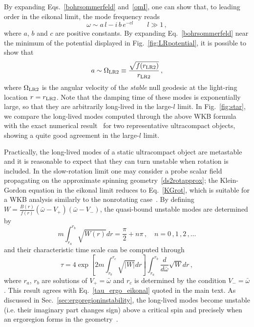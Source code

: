 \documentclass[11pt]{article}
\numberwithin{equation}{section} %
\begin{document}
%
By expanding Eqs.~\eqref{bohrsommerfeld} and~\eqref{omI}, one can show that, to leading order in the eikonal limit, the mode frequency reads
%
\begin{equation}
\omega\sim a\, l -i\, b\, e^{-c l}\qquad l\gg1\,, \label{omega}
\end{equation}
%
where $a$, $b$ and $c$ are positive constants. By expanding Eq.~\eqref{bohrsommerfeld} near the minimum of the potential displayed in Fig.~\ref{fig:LRpotential}, it is possible to show that~\cite{Cardoso:2014sna}
%
\begin{equation}
 a\sim\Omega_{\rm LR2}\equiv\frac{\sqrt{f(r_{\rm LR2})}}{r_{\rm LR2}}\,,
\end{equation}
%
where $\Omega_{\rm LR2}$ is the angular velocity of the \emph{stable} null geodesic at the light-ring location $r=r_{\rm LR2}$. Note that the damping time of these modes is exponentially large, so that they are arbitrarily long-lived in the large-$l$ limit. In Fig.~\ref{fig:star}, we compare the long-lived modes computed through the above WKB formula with the exact numerical result~\cite{Cardoso:2014sna} for two representative ultracompact objects, showing a quite good agreement in the large-$l$ limit.

Practically, the long-lived modes of a static ultracompact object are metastable and it is reasonable to expect that they can turn unstable when rotation is included. In the slow-rotation limit one may consider a probe scalar field propagating on the approximate spinning geometry~\eqref{ds2rotapprox}; the Klein-Gordon equation in the eikonal limit reduces to Eq.~\eqref{KGrot}, which is suitable for a WKB analysis similarly to the nonrotating case~\cite{CominsSchutz,Cardoso:2007az}. By defining $W=\frac{B(r)}{f(r)}\left (\bar{\omega}-V_+\right )\left (\bar{\omega}-V_-\right )$, the quasi-bound unstable modes are determined by
%
\begin{equation}
m\int_{r_a}^{r_b}\sqrt{W(r)}dr =\frac{\pi}{2}+n\pi\,,\quad n=0\,,1\,,2\,,\dots
\end{equation}
%
and their characteristic time scale can be computed through
%
\begin{equation}
\tau=4\exp{\left[2m\int_{r_b}^{r_c}\sqrt{|W|}dr\right]}\int_{r_a}^{r_b}\frac{d}{d\bar{\omega}}
\sqrt{W}dr\,,
\end{equation}
%
where $r_a$, $r_b$ are solutions of $V_+=\bar{\omega}$ and $r_c$ is determined by the condition
$V_-=\bar{\omega}$. This result agrees with Eq.~\eqref{tau_ergo_eikonal} quoted in the main text.
As discussed in Sec.~\ref{sec:ergoregioninstability}, the long-lived modes become unstable (i.e. their imaginary part changes sign) above a critical spin and precisely when an ergoregion forms in the geometry~\cite{CominsSchutz,Cardoso:2007az,Cardoso:2014sna}.




%
\raggedright


\end{document}
